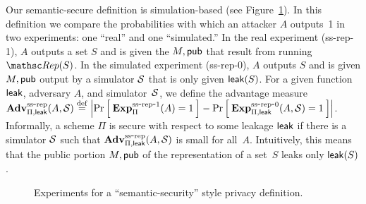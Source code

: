 Our semantic-secure definition is simulation-based (see
Figure~\ref{fig:privacy-ss}).
In this definition we compare the probabilities with which an attacker $A$ outputs~1
in two experiments: one ``real'' and one ``simulated.''
In the real experiment (ss-rep-1), $A$ outputs a set $S$ and is given the
$M,{\sf pub}$ that result from running $\Rep(S)$.
In the simulated experiment (ss-rep-0), $A$ outputs $S$ and is given $M, {\sf pub}$ output
by a simulator ${\cal S}$ that is only given ${\sf leak}(S)$. 
For a given function ${\sf leak}$, adversary $A$, and simulator~${\cal S}$,
we define the advantage measure
$\mathrm{\mathbf{Adv}}^{\mathrm{ss\mbox{-}rep}}_{\Pi,{\sf leak}}(A,{\cal S}) \stackrel{\rm def}{=}
\left| \Pr\left[\: \mathrm{\mathbf{Exp}}^{\mathrm{ss\mbox{-}rep\mbox{-}1}}_{\Pi}(A)=1 \:\right] -
\Pr\left[\: \mathrm{\mathbf{Exp}}^{\mathrm{ss\mbox{-}rep\mbox{-}0}}_{\Pi,{\sf leak}}(A, {\cal S})=1 \:\right] \right|$.
Informally, a scheme $\Pi$ is secure with respect to some leakage ${\sf leak}$
if there is a simulator ${\cal S}$ such that $\mathrm{\mathbf{Adv}}^{\mathrm{ss\mbox{-}rep}}_{\Pi,{\sf leak}}(A,{\cal S})$ is small
for all~$A$. Intuitively, this means that the public portion
$M, {\sf pub}$ of the representation of a set~$S$ leaks only ${\sf leak}(S)$. 

\begin{figure}[hbtp]
\centering
{}
\caption{Experiments for a ``semantic-security'' style privacy
  definition.}
\label{fig:privacy-ss}
\end{figure}


